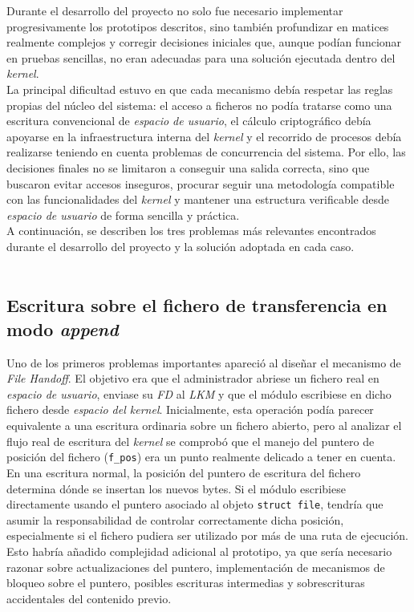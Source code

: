 Durante el desarrollo del proyecto no solo fue necesario implementar progresivamente los prototipos descritos, sino también profundizar en matices realmente complejos y corregir decisiones iniciales que, aunque podían funcionar en pruebas sencillas, no eran adecuadas para una solución ejecutada dentro del \textit{kernel}.\\

La principal dificultad estuvo en que cada mecanismo debía respetar las reglas propias del núcleo del sistema: el acceso a ficheros no podía tratarse como una escritura convencional de \textit{espacio de usuario}, el cálculo criptográfico debía apoyarse en la infraestructura interna del \textit{kernel} y el recorrido de procesos debía realizarse teniendo en cuenta problemas de concurrencia del sistema.
Por ello, las decisiones finales no se limitaron a conseguir una salida correcta, sino que buscaron evitar accesos inseguros, procurar seguir una metodología compatible con las funcionalidades del \textit{kernel} y mantener una estructura verificable desde \textit{espacio de usuario} de forma sencilla y práctica.\\

A continuación, se describen los tres problemas más relevantes encontrados durante el desarrollo del proyecto y la solución adoptada en cada caso.\\

\

\subsection{Escritura sobre el fichero de transferencia en modo \textit{append}}

Uno de los primeros problemas importantes apareció al diseñar el mecanismo de \textit{File Handoff}.
El objetivo era que el administrador abriese un fichero real en \textit{espacio de usuario}, enviase su \textit{FD} al \textit{LKM} y que el módulo escribiese en dicho fichero desde \textit{espacio del kernel}.
Inicialmente, esta operación podía parecer equivalente a una escritura ordinaria sobre un fichero abierto, pero al analizar el flujo real de escritura del \textit{kernel} se comprobó que el manejo del puntero de posición del fichero (\verb|f_pos|) era un punto realmente delicado a tener en cuenta.\\

En una escritura normal, la posición del puntero de escritura del fichero determina dónde se insertan los nuevos bytes.
Si el módulo escribiese directamente usando el puntero asociado al objeto \texttt{struct file}, tendría que asumir la responsabilidad de controlar correctamente dicha posición, especialmente si el fichero pudiera ser utilizado por más de una ruta de ejecución.
Esto habría añadido complejidad adicional al prototipo, ya que sería necesario razonar sobre actualizaciones del puntero, implementación de mecanismos de bloqueo sobre el puntero, posibles escrituras intermedias y sobrescrituras accidentales del contenido previo.\\


